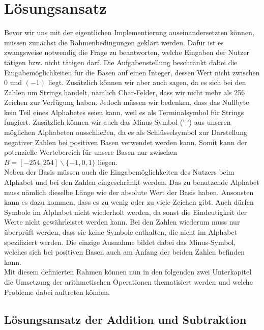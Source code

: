 \documentclass[course=erap]{aspdoc}
\begin{document}
    \section{Lösungsansatz}\label{Loesungsansatz}

    Bevor wir uns mit der eigentlichen Implementierung auseinandersetzten können, müssen zunächst die
    Rahmenbedingungen geklärt werden. Dafür ist es zwangsweise notwendig die Frage zu beantworten, welche Eingaben der Nutzer
    tätigen bzw. nicht tätigen darf. Die Aufgabenstellung beschränkt dabei die Eingabemöglichkeiten für die Basen
    auf einen Integer, dessen Wert nicht zwischen $0$ und $(-1)$ liegt. Zusätzlich können wir aber auch sagen, da es sich bei den Zahlen
    um Strings handelt, nämlich Char-Felder, dass wir nicht mehr als 256 Zeichen zur Verfügung
    haben. Jedoch müssen wir bedenken, dass das Nullbyte kein Teil eines Alphabetes seien kann, weil es
    als Terminalsymbol für Strings fungiert. Zusätzlich können wir auch das Minus-Symbol ('-') aus unseren möglichen
    Alphabeten ausschließen, da es als Schlüsselsymbol zur Darstellung negativer Zahlen bei positiven Basen verwendet werden
    kann. Somit kann der potenzielle Wertebereich für unsere Basen
    nur zwischen  $B = [-254, 254] \backslash  \{ -1, 0, 1\}$ liegen. \\
    \newline
    Neben der Basis müssen auch die Eingabemöglichkeiten des Nutzers beim Alphabet und bei den Zahlen eingeschränkt werden.
    Das zu benutzende Alphabet muss nämlich dieselbe Länge wie der absolute Wert der Basis haben. Ansonsten kann es dazu kommen,
    dass es zu wenig oder zu viele Zeichen gibt. Auch dürfen Symbole im Alphabet nicht wiederholt werden, da sonst
    die Eindeutigkeit der Werte nicht gewährleistet werden kann. Bei den Zahlen wiederum muss nur überprüft werden,
    dass sie keine Symbole enthalten, die nicht im Alphabet spezifiziert werden. Die einzige Ausnahme bildet
    dabei das Minus-Symbol, welches sich bei positiven Basen auch am Anfang der beiden Zahlen befinden kann. \\
    \newline
    Mit diesem definierten Rahmen können nun in den folgenden zwei Unterkapitel
    die Umsetzung der arithmetischen Operationen thematisiert werden und welche Probleme dabei
    auftreten können.

    \subsection{Lösungsansatz der Addition und Subtraktion}\label{AddUndSub}
\end{document}
